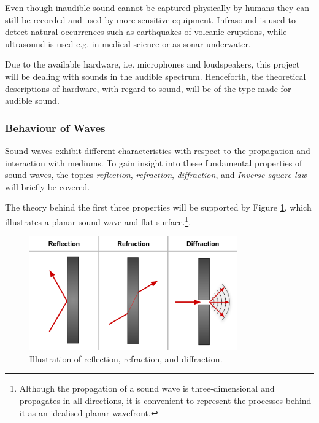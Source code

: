 Even though inaudible sound cannot be captured physically by humans they can still be recorded and used by more sensitive equipment. Infrasound is used to detect natural occurrences such as earthquakes of volcanic eruptions, while ultrasound is used e.g. in medical science or as sonar underwater. \cite{Acoustics:Handbook_of_Acoustics}

Due to the available hardware, i.e. microphones and loudspeakers, this project will be dealing with sounds in the audible spectrum. Henceforth, the theoretical descriptions of hardware, with regard to sound, will be of the type made for audible sound.    

\subsubsection{Behaviour of Waves}
Sound waves exhibit different characteristics with respect to the propagation and interaction with mediums. To gain insight into these fundamental properties of sound waves, the topics \textit{reflection}, \textit{refraction}, \textit{diffraction}, and \textit{Inverse-square law} will briefly be covered.

The theory behind the first three properties will be supported by Figure \ref{fig:soundandmedium}, which illustrates a planar sound wave and flat surface.\footnote{Although the propagation of a sound wave is three-dimensional and propagates in all directions, it is convenient to represent the processes behind it as an idealised planar wavefront.\cite{Acoustics:Handbook_of_Acoustics}}.

\begin{figure}[H]
    \centering
    \includegraphics[width=0.8\textwidth]{figures/1Problem_analysis/Reflection_Refraction_Diffraction.pdf}
    \caption{Illustration of reflection, refraction, and diffraction.}
    \label{fig:soundandmedium}
\end{figure}

